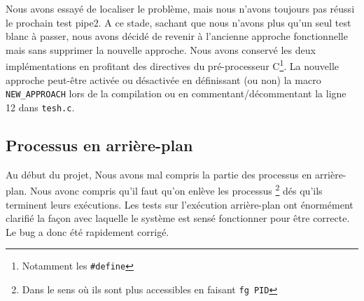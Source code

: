 \documentclass[12pt]{article}
\begin{document}

Nous avons essayé de localiser le problème, mais nous n'avons toujours pas réussi le prochain test pipe2. A ce stade, sachant que nous n'avons plus qu'un seul test blanc à passer, nous avons décidé de revenir à l'ancienne approche fonctionnelle mais sans supprimer la nouvelle approche. Nous avons conservé les deux implémentations en profitant des directives du pré-processeur C\footnote{Notamment les \texttt{\#define}}.
La nouvelle approche peut-être activée ou désactivée en définissant (ou non) la macro \texttt{NEW\_APPROACH} lors de la compilation ou en commentant/décommentant la ligne \textit{}{12} dans \texttt{tesh.c}.

\subsection{Processus en arrière-plan}
Au début du projet, Nous avons mal compris la partie des processus en arrière-plan. Nous avonc compris qu'il faut qu'on enlève les processus \footnote{Dans le sens où ils sont plus accessibles en faisant \texttt{fg PID}} dés qu'ils terminent leurs exécutions. Les tests sur l'exécution arrière-plan ont énormément clarifié la façon avec laquelle le système est sensé fonctionner pour être correcte. Le bug a donc été rapidement corrigé.


\end{document}
